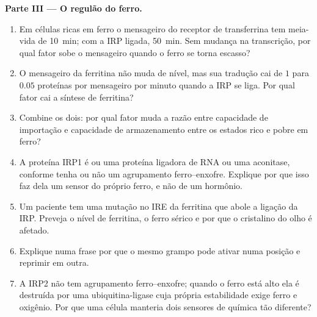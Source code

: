 \begin{problem}
\medskip
\noindent\textbf{Parte III --- O regulão do ferro.}
\begin{enumerate}[resume]
  \item Em células ricas em ferro o mensageiro do receptor de
        transferrina tem meia-vida de \qty{10}{min}; com a IRP ligada,
        \qty{50}{min}. Sem mudança na transcrição, por qual fator sobe
        o mensageiro quando o ferro se torna escasso?
  \item O mensageiro da ferritina não muda de nível, mas sua tradução
        cai de $1$ para $0.05$ proteínas por mensageiro por minuto
        quando a IRP se liga. Por qual fator cai a síntese de
        ferritina?
  \item Combine os dois: por qual fator muda a razão entre capacidade
        de importação e capacidade de armazenamento entre os estados
        rico e pobre em ferro?
  \item A proteína IRP1 é ou uma proteína ligadora de RNA ou uma
        aconitase, conforme tenha ou não um agrupamento
        ferro--enxofre. Explique por que isso faz dela um sensor do
        próprio ferro, e não de um hormônio.
  \item Um paciente tem uma mutação no IRE da ferritina que abole a
        ligação da IRP. Preveja o nível de ferritina, o ferro sérico e
        por que o cristalino do olho é afetado.
  \item Explique numa frase por que o mesmo grampo pode ativar numa
        posição e reprimir em outra.
  \item A IRP2 não tem agrupamento ferro--enxofre; quando o ferro está
        alto ela é destruída por uma ubiquitina-ligase cuja própria
        estabilidade exige ferro e oxigênio. Por que uma célula
        manteria dois sensores de química tão diferente?
\end{enumerate}


\end{problem}
